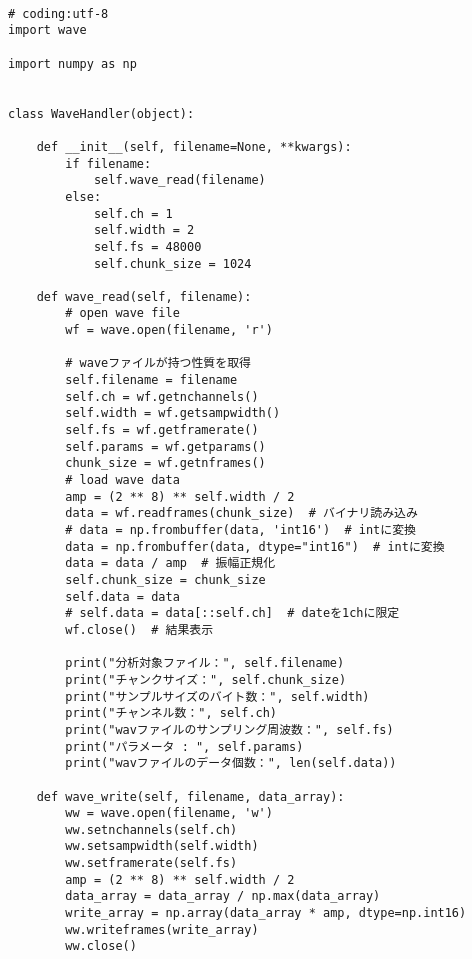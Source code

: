 \begin{lstlisting}[caption=wave\_handler.py,label=wave_handler.py]

# coding:utf-8
import wave

import numpy as np


class WaveHandler(object):

    def __init__(self, filename=None, **kwargs):
        if filename:
            self.wave_read(filename)
        else:
            self.ch = 1
            self.width = 2
            self.fs = 48000
            self.chunk_size = 1024

    def wave_read(self, filename):
        # open wave file
        wf = wave.open(filename, 'r')

        # waveファイルが持つ性質を取得
        self.filename = filename
        self.ch = wf.getnchannels()
        self.width = wf.getsampwidth()
        self.fs = wf.getframerate()
        self.params = wf.getparams()
        chunk_size = wf.getnframes()
        # load wave data
        amp = (2 ** 8) ** self.width / 2
        data = wf.readframes(chunk_size)  # バイナリ読み込み
        # data = np.frombuffer(data, 'int16')  # intに変換
        data = np.frombuffer(data, dtype="int16")  # intに変換
        data = data / amp  # 振幅正規化
        self.chunk_size = chunk_size
        self.data = data
        # self.data = data[::self.ch]  # dateを1chに限定
        wf.close()  # 結果表示

        print("分析対象ファイル：", self.filename)
        print("チャンクサイズ：", self.chunk_size)
        print("サンプルサイズのバイト数：", self.width)
        print("チャンネル数：", self.ch)
        print("wavファイルのサンプリング周波数：", self.fs)
        print("パラメータ : ", self.params)
        print("wavファイルのデータ個数：", len(self.data))

    def wave_write(self, filename, data_array):
        ww = wave.open(filename, 'w')
        ww.setnchannels(self.ch)
        ww.setsampwidth(self.width)
        ww.setframerate(self.fs)
        amp = (2 ** 8) ** self.width / 2
        data_array = data_array / np.max(data_array)
        write_array = np.array(data_array * amp, dtype=np.int16)
        ww.writeframes(write_array)
        ww.close()
\end{lstlisting}

